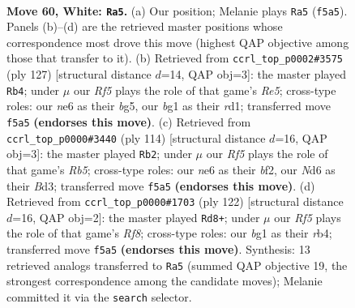 \documentclass[11pt]{article}
\begin{document}
\clearpage

\begin{figure}[p]\centering
\begin{subfigure}{0.46\textwidth}\centering
\resizebox{\linewidth}{!}{%
\newchessgame
\chessboard[
  setfen={6k1/8/3Nn1P1/5R2/P7/7r/8/4K1b1 w - - 1 60},
  showmover=false,
  pgfstyle=straightmove, color=movearrow, markmove={f5-a5}
]}
\caption{}
\end{subfigure}\hfill
\begin{subfigure}{0.46\textwidth}\centering
\resizebox{\linewidth}{!}{%
\newchessgame
\chessboard[
  setfen={6k1/6p1/8/2n3B1/4r3/7K/8/3R4 b - - 13 64},
  showmover=false,
  pgfstyle=straightmove, color=movearrow, markmove={e4-b4}
]}
\caption{}
\end{subfigure}
\\[4pt]
\begin{subfigure}{0.46\textwidth}\centering
\resizebox{\linewidth}{!}{%
\newchessgame
\chessboard[
  setfen={8/2r5/P3k3/1R6/5K2/3B4/5b2/8 w - - 3 58},
  showmover=false,
  pgfstyle=straightmove, color=movearrow, markmove={b5-b2}
]}
\caption{}
\end{subfigure}\hfill
\begin{subfigure}{0.46\textwidth}\centering
\resizebox{\linewidth}{!}{%
\newchessgame
\chessboard[
  setfen={5R2/8/3k2N1/5P1n/1r6/8/2K5/8 w - - 7 62},
  showmover=false,
  pgfstyle=straightmove, color=movearrow, markmove={f8-d8}
]}
\caption{}
\end{subfigure}
\caption{\textbf{Move 60, White: \texttt{Ra5}.} (a) Our position; Melanie plays \texttt{Ra5} (\texttt{f5a5}). Panels (b)--(d) are the retrieved master positions whose correspondence most drove this move (highest QAP objective among those that transfer to it). (b) Retrieved from \texttt{ccrl\_top\_p0002\#3575} (ply 127) [structural distance $d$=14, QAP obj=3]: the master played \texttt{Rb4}; under $\mu$ our \emph{Rf5} plays the role of that game's \emph{Re5}; cross-type roles: our \emph{n}e6 as their \emph{b}g5, our \emph{b}g1 as their \emph{r}d1; transferred move \texttt{f5a5} \textbf{(endorses this move)}. (c) Retrieved from \texttt{ccrl\_top\_p0000\#3440} (ply 114) [structural distance $d$=16, QAP obj=3]: the master played \texttt{Rb2}; under $\mu$ our \emph{Rf5} plays the role of that game's \emph{Rb5}; cross-type roles: our \emph{n}e6 as their \emph{b}f2, our \emph{N}d6 as their \emph{B}d3; transferred move \texttt{f5a5} \textbf{(endorses this move)}. (d) Retrieved from \texttt{ccrl\_top\_p0000\#1703} (ply 122) [structural distance $d$=16, QAP obj=2]: the master played \texttt{Rd8+}; under $\mu$ our \emph{Rf5} plays the role of that game's \emph{Rf8}; cross-type roles: our \emph{b}g1 as their \emph{r}b4; transferred move \texttt{f5a5} \textbf{(endorses this move)}. Synthesis: 13 retrieved analogs transferred to \texttt{Ra5} (summed QAP objective 19, the strongest correspondence among the candidate moves); Melanie committed it via the \texttt{search} selector.}
\label{fig:thought-m118}
\end{figure}
\end{document}
